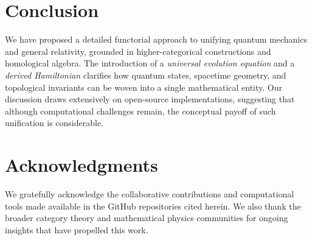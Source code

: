 \documentclass[11pt]{article}
\begin{document}
\section{Conclusion}

We have proposed a detailed functorial approach to unifying quantum mechanics and general relativity, grounded in higher-categorical constructions and homological algebra. The introduction of a \emph{universal evolution equation} and a \emph{derived Hamiltonian} clarifies how quantum states, spacetime geometry, and topological invariants can be woven into a single mathematical entity. Our discussion draws extensively on open-source implementations, suggesting that although computational challenges remain, the conceptual payoff of such unification is considerable.

\section*{Acknowledgments}

We gratefully acknowledge the collaborative contributions and computational tools made available in the GitHub repositories cited herein. We also thank the broader category theory and mathematical physics communities for ongoing insights that have propelled this work.
\end{document}
